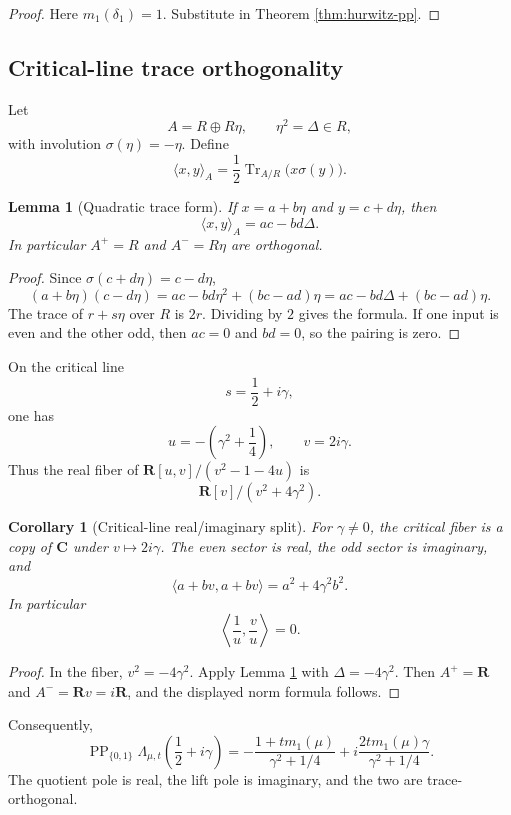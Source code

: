 \documentclass[11pt]{article}
\newcommand{\C}{\mathbf C}
\newcommand{\R}{\mathbf R}
\newcommand{\PP}{\operatorname{PP}}
\newcommand{\Tr}{\operatorname{Tr}}
\theoremstyle{plain}
\newtheorem{lemma}[theorem]{Lemma}
\newtheorem{corollary}[theorem]{Corollary}
\theoremstyle{definition}
\begin{document}
\begin{proof}
Here \(m_1(\delta_1)=1\).  Substitute in Theorem \ref{thm:hurwitz-pp}.
\end{proof}

\subsection{Critical-line trace orthogonality}

Let
\[
   A=R\oplus R\eta,
   \qquad
   \eta^2=\Delta\in R,
\]
with involution \(\sigma(\eta)=-\eta\).  Define
\[
   \langle x,y\rangle_A=\frac12\Tr_{A/R}\bigl(x\sigma(y)\bigr).
\]

\begin{lemma}[Quadratic trace form]\label{lem:quadratic-trace}
If \(x=a+b\eta\) and \(y=c+d\eta\), then
\[
   \langle x,y\rangle_A=ac-bd\Delta.
\]
In particular \(A^+=R\) and \(A^-=R\eta\) are orthogonal.
\end{lemma}

\begin{proof}
Since \(\sigma(c+d\eta)=c-d\eta\),
\[
   (a+b\eta)(c-d\eta)=ac-bd\eta^2+(bc-ad)\eta=ac-bd\Delta+(bc-ad)\eta.
\]
The trace of \(r+s\eta\) over \(R\) is \(2r\).  Dividing by \(2\) gives the formula.  If one input is even and the other odd, then \(ac=0\) and \(bd=0\), so the pairing is zero.
\end{proof}

On the critical line
\[
   s=\frac12+i\gamma,
\]
one has
\[
   u=-\left(\gamma^2+\frac14\right),
   \qquad
   v=2i\gamma.
\]
Thus the real fiber of \(\R[u,v]/(v^2-1-4u)\) is
\[
   \R[v]/(v^2+4\gamma^2).
\]

\begin{corollary}[Critical-line real/imaginary split]\label{cor:critical-split}
For \(\gamma\ne0\), the critical fiber is a copy of \(\C\) under \(v\mapsto 2i\gamma\).  The even sector is real, the odd sector is imaginary, and
\[
   \langle a+bv,a+bv\rangle=a^2+4\gamma^2b^2.
\]
In particular
\[
   \left\langle \frac1u,\frac vu\right\rangle=0.
\]
\end{corollary}

\begin{proof}
In the fiber, \(v^2=-4\gamma^2\).  Apply Lemma \ref{lem:quadratic-trace} with \(\Delta=-4\gamma^2\).  Then \(A^+=\R\) and \(A^-=\R v=i\R\), and the displayed norm formula follows.
\end{proof}

Consequently,
\[
 \PP_{\{0,1\}}\Lambda_{\mu,t}\left(\frac12+i\gamma\right)
 =-\frac{1+t m_1(\mu)}{\gamma^2+1/4}
 +i\frac{2t m_1(\mu)\gamma}{\gamma^2+1/4}.
\]
The quotient pole is real, the lift pole is imaginary, and the two are trace-orthogonal.
\end{document}
